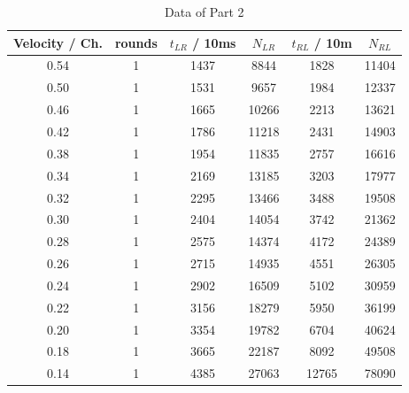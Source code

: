 \documentclass[11pt,a4paper,notitlepage]{scrartcl}
\begin{document}
\begin{table}[H]
	\centering
	\ContinuedFloat
	\begin{tabular}{c|c|c|c|c|c}
		Velocity / Ch. & rounds & $t_{LR}$  / 10ms & $N_{LR}$  &$t_{RL}$  / 10m & $N_{RL}$  \\
		\hline
		0.54 & 1      & 1437        & 8844  & 1828        & 11404 \\
		0.50 & 1      & 1531        & 9657  & 1984        & 12337 \\
		0.46 & 1      & 1665        & 10266 & 2213        & 13621 \\
		0.42 & 1      & 1786        & 11218 & 2431        & 14903 \\
		0.38 & 1      & 1954        & 11835 & 2757        & 16616 \\
		0.34 & 1      & 2169        & 13185 & 3203        & 17977 \\
		0.32 & 1      & 2295        & 13466 & 3488        & 19508 \\
		0.30 & 1      & 2404        & 14054 & 3742        & 21362 \\
		0.28 & 1      & 2575        & 14374 & 4172        & 24389 \\
		0.26 & 1      & 2715        & 14935 & 4551        & 26305 \\
		0.24 & 1      & 2902        & 16509 & 5102        & 30959 \\
		0.22 & 1      & 3156        & 18279 & 5950        & 36199 \\
		0.20 & 1      & 3354        & 19782 & 6704        & 40624 \\
		0.18 & 1      & 3665        & 22187 & 8092        & 49508 \\
		0.14 & 1      & 4385        & 27063 & 12765       & 78090
	\end{tabular}
	\caption{Data of Part 2}
\end{table}
\newpage

\label{sec:conc}
\printbibliography[heading=bibintoc]
\end{document}
